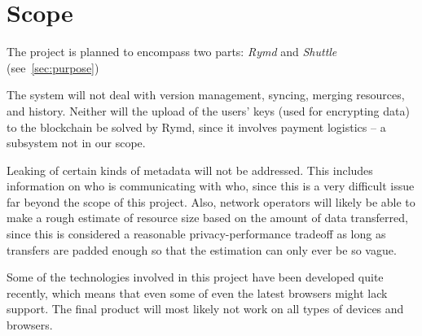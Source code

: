 \section{Scope}

The project is planned to encompass two parts: \emph{Rymd} and \emph{Shuttle} (see~\ref{sec:purpose})

The system will not deal with version management, syncing, merging resources, and history. Neither will the upload of the users’ keys (used for encrypting data) to the blockchain be solved by Rymd, since it involves payment logistics – a subsystem not in our scope.

Leaking of certain kinds of metadata will not be addressed. This includes information on who is communicating with who, since this is a very difficult issue far beyond the scope of this project. Also, network operators will likely be able to make a rough estimate of resource size based on the amount of data transferred, since this is considered a reasonable privacy-performance tradeoff as long as transfers are padded enough so that the estimation can only ever be so vague.

Some of the technologies involved in this project have been developed quite recently, which means that even some of even the latest browsers might lack support. The final product will most likely not work on all types of devices and browsers.
